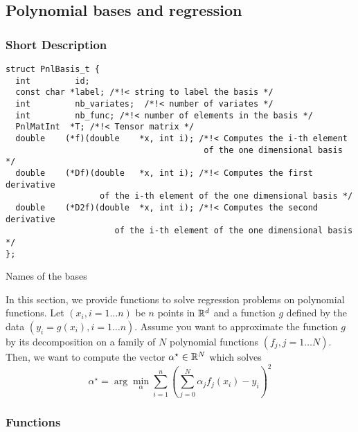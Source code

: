 \subsection{Polynomial bases and regression}
\subsubsection{Short Description}

\begin{verbatim}
struct PnlBasis_t {
  int         id;
  const char *label; /*!< string to label the basis */
  int         nb_variates;  /*!< number of variates */
  int         nb_func; /*!< number of elements in the basis */
  PnlMatInt  *T; /*!< Tensor matrix */
  double    (*f)(double    *x, int i); /*!< Computes the i-th element 
                                        of the one dimensional basis */
  double    (*Df)(double   *x, int i); /*!< Computes the first derivative 
                   of the i-th element of the one dimensional basis */
  double    (*D2f)(double  *x, int i); /*!< Computes the second derivative
                      of the i-th element of the one dimensional basis */
};
\end{verbatim}

\begin{table}[h!]
  \begin{describeconst}
  \end{describeconst}
  \caption{Names of the bases}
  \label{basis_index}
\end{table}

In this section, we provide functions to solve regression problems on
polynomial functions. Let $(x_i, i=1 \dots n)$ be $n$ points in ${\mathbb R}^d$ and a
function $g$ defined by the data $(y_i = g(x_i), i=1 \dots n)$. Assume you
want to approximate the function $g$ by its decomposition on a family of $N$
polynomial functions $(f_j, j=1\dots N)$. Then, we want to compute the vector
$\alpha^\star \in {\mathbb R}^N$ which solves
\begin{equation*} \alpha^\star = \arg\min_\alpha \sum_{i=1}^{n}
  \left(\sum_{j=0}^N \alpha_j f_j(x_i) - y_i\right)^2
\end{equation*}

\subsubsection{Functions}

